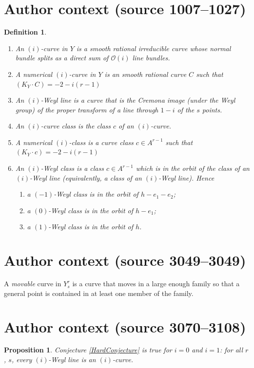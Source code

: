 \documentclass[10pt,a4paper]{amsart}
\def\calO{\mathcal{O}}
\newtheorem{definition}{Definition}
\newtheorem{proposition}{Proposition}
\begin{document}
\section*{Author context (source 1007--1027)}
\begin{definition}\label{def3.5}
\begin{enumerate} Fix $i \in \{-1,0,1\}$, and let $Y=Y^r_s$.
\item An \emph{$(i)$-curve} in $Y$ is a smooth rational  irreducible curve
whose normal bundle splits as a direct sum of $\calO(i)$ line bundles.
\item A \emph{numerical $(i)$-curve} in $Y$ is an smooth rational curve $C$ such that
$(K_Y \cdot C) = -2 -i(r-1)$
\item An \emph{$(i)$-Weyl line} is a curve that is the Cremona image 
(under the Weyl group) of the proper transform of a line through $1-i$ of the $s$ points.
\item An \emph{$(i)$-curve class} is the class $c$ of an $(i)$-curve.
\item A \emph{numerical $(i)$-class} is a curve class $c \in A^{r-1}$ such that
$(K_Y \cdot c ) = -2 -i(r-1)$
\item An \emph{$(i)$-Weyl class} is a class $c \in A^{r-1}$
which is in the orbit of the class of an $(i)$-Weyl line
(equivalently, a class of an $(i)$-Weyl line). Hence
\begin{enumerate}
\item a $(-1)$-Weyl class is in the orbit of $h-e_{1}-e_{2}$; 
\item a $(0)$-Weyl class is in the orbit of $h-e_1$;
\item a $(1)$-Weyl class is in the orbit of $h$.
\end{enumerate}
\end{enumerate}
\end{definition}

\section*{Author context (source 3049--3049)}
A \emph{movable} curve in $Y^r_s$ is a curve that moves in a large enough family so that a general point is contained in at least one member of the family.

\section*{Author context (source 3070--3108)}
\begin{proposition}\label{ConjectureProofTheorem}
Conjecture \ref{HardConjecture} is true for $i = 0$ and $i=1$:
for all $r$, $s$, every $(i)$-Weyl line is an $(i)$-curve.
\end{proposition}
\end{document}
